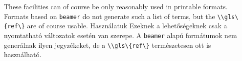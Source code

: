 
{
These facilities can of course be only reasonably used in printable formats.
Formats based on \lstinline|beamer| do not generate such a list of terms,
but the \lstinline|\\gls\{ref\}|  are of course usable.
}
{Használatuk}
{
Ezeknek a lehetőségeknek csak a nyomtatható változatok esetén van szerepe.
A \lstinline|beamer| alapú formátumok nem generálnak ilyen jegyzékeket,
de a \lstinline|\\gls\{ref\}| természetesen ott is használható.
}

